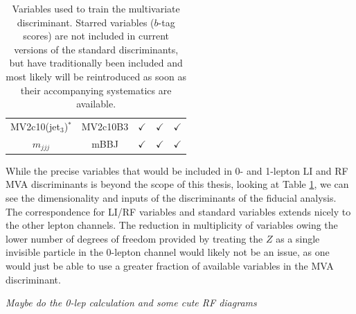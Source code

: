 \begin{table}[!htbp]
\begin{center}
\begin{tabular}{c|cccc}
MV2c10(jet$_{3}$)$^*$ & MV2c10B3 & $\checkmark$ & $\checkmark$ & $\checkmark$ \\
$m_{jjj}$ & mBBJ & $\checkmark$ & $\checkmark$ & $\checkmark$ \\
\hline\hline
\end{tabular}
\caption{Variables used to train the multivariate discriminant. Starred variables ($b$-tag scores) are not included in current versions of the standard discriminants, but have traditionally been included and most likely will be reintroduced as soon as their accompanying systematics are available.
}
\label{tbl:MVAinputs}
\end{center}
\end{table}

While the precise variables that would be included in 0- and 1-lepton LI and RF MVA discriminants is beyond the scope of this thesis, looking at Table \ref{tbl:MVAinputs}, we can see the dimensionality and inputs of the discriminants of the fiducial analysis.  The correspondence for LI/RF variables and standard variables extends nicely to the other lepton channels.  The reduction in multiplicity of variables owing the lower number of degrees of freedom provided by treating the $Z$ as a single invisible particle in the 0-lepton channel would likely not be an issue, as one would just be able to use a greater fraction of available variables in the MVA discriminant.

\emph{Maybe do the 0-lep calculation and some cute RF diagrams}%

